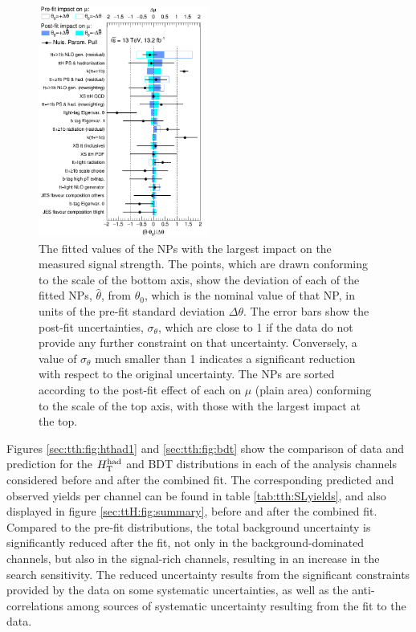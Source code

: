 \begin{figure}[htb!]
 \centering
 \includegraphics[width=0.5\textwidth]{figures/ttH/Ranking.png}
\captionsetup{width=0.85\textwidth}  \caption{\small The fitted values of the NPs with the largest impact on the measured signal strength. The points, which are drawn conforming to the scale of the bottom axis, show the deviation of each of the fitted NPs, $\hat{\theta}$, from $\theta_{0}$, which is the nominal value of that NP, in units of the pre-fit standard deviation $\Delta\theta$. The error bars show the post-fit uncertainties, $\sigma_{\theta}$, which are close to 1 if the data do not provide any further constraint on that uncertainty. Conversely, a value of $\sigma_{\theta}$ much smaller than 1 indicates a significant reduction with respect to the original uncertainty. The NPs are sorted according to the post-fit effect of each on $\mu$ (plain area) conforming to the scale of the top axis, with those with the largest impact at the top.}
\label{sec:ttH:fig:ranking}
\end{figure}


Figures \ref{sec:tth:fig:hthad1} and \ref{sec:tth:fig:bdt} show the comparison of data and prediction for the $H_{\rm T}^{\rm had}$ and BDT distributions in each of the analysis channels considered before and after the combined fit. The corresponding predicted and observed yields per channel can be found in table \ref{tab:tth:SLyields}, and also displayed in figure \ref{sec:ttH:fig:summary}, before and after the combined fit. Compared to the pre-fit distributions, the total background uncertainty is significantly reduced after the fit, not only in the background-dominated channels, but also in the signal-rich channels, resulting in an increase in the search sensitivity. The reduced uncertainty results from the significant constraints provided by the data on some systematic uncertainties, as well as the anti-correlations among sources of systematic uncertainty resulting from the fit to the data. 

